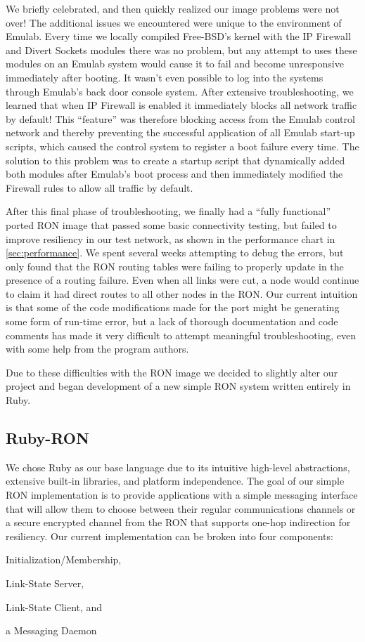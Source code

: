 We briefly celebrated, and then quickly realized our image problems were
not over!  The additional issues we encountered were unique to the
environment of Emulab.  Every time we locally compiled Free-BSD's kernel
with the IP Firewall and Divert Sockets modules there was no problem, but
any attempt to uses these modules on an Emulab system would cause it to
fail and become unresponsive immediately after booting.  It wasn't even
possible to log into the systems through Emulab's back door console system.
After extensive troubleshooting, we learned that when IP Firewall is
enabled it immediately blocks all network traffic by default!  This
“feature” was therefore blocking access from the Emulab control network and
thereby preventing the successful application of all Emulab start-up
scripts, which caused the control system to register a boot failure every
time.  The solution to this problem was to create a startup script that
dynamically added both modules after Emulab's boot process and then
immediately modified the Firewall rules to allow all traffic by default.

After this final phase of troubleshooting, we finally had a ``fully
functional'' ported RON image that passed some basic connectivity testing,
but failed to improve resiliency in our test network, as shown in the
performance chart in \cref{sec:performance}.  We spent several weeks
attempting to debug the errors, but only found that the RON routing tables
were failing to properly update in the presence of a routing failure.  Even
when all links were cut, a node would continue to claim it had direct
routes to all other nodes in the RON.  Our current intuition is that some
of the code modifications made for the port might be generating some form
of run-time error, but a lack of thorough documentation and code comments
has made it very difficult to attempt meaningful troubleshooting, even with
some help from the program authors.

Due to these difficulties with the RON image we decided to slightly alter
our project and began development of a new simple RON system written
entirely in Ruby.


\subsection{Ruby-RON}
\label{sec:ruby-ron}

We chose Ruby as our base language due to its intuitive high-level
abstractions, extensive built-in libraries, and platform independence.  The
goal of our simple RON implementation is to provide applications with a
simple messaging interface that will allow them to choose between their
regular communications channels or a secure encrypted channel from the RON
that supports one-hop indirection for resiliency.  Our current
implementation can be broken into four components:
\begin{inparaenum}[(a)]
\item Initialization/Membership,
\item Link-State Server,
\item Link-State Client, and
\item a Messaging Daemon
\end{inparaenum}

